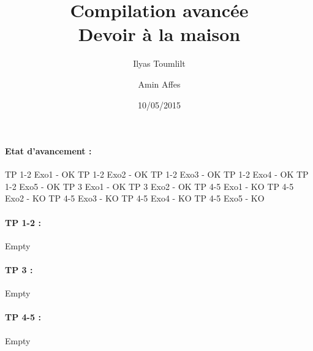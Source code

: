 \documentclass[a4paper, 11pt]{article}
\begin{document}
\title{Compilation avanc\'ee\\Devoir \`a la maison}
\author{Ilyas Toumlilt}
\author{Amin Affes}
\date{10/05/2015}

\maketitle

\paragraph{Etat d'avancement :}
TP 1-2 Exo1 - OK
TP 1-2 Exo2 - OK
TP 1-2 Exo3 - OK
TP 1-2 Exo4 - OK
TP 1-2 Exo5 - OK
TP 3   Exo1 - OK
TP 3   Exo2 - OK
TP 4-5 Exo1 - KO
TP 4-5 Exo2 - KO
TP 4-5 Exo3 - KO
TP 4-5 Exo4 - KO
TP 4-5 Exo5 - KO

\paragraph{TP 1-2 :}
Empty

\paragraph{TP 3 :}
Empty

\paragraph{TP 4-5 :}
Empty
\end{document}
